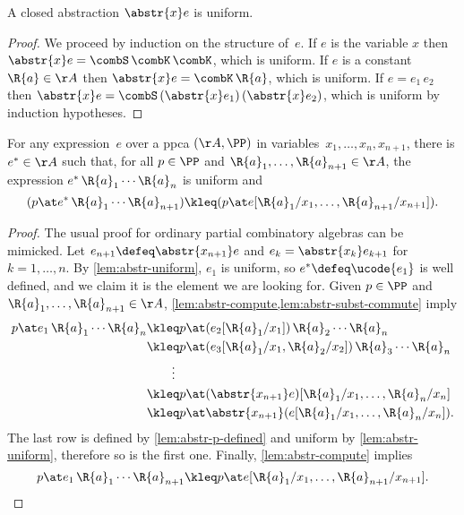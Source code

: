 \begin{lemma}
  \label{lem:abstr-uniform}%
  A closed abstraction $\abstr{x} e$ is uniform.
\end{lemma}

\begin{proof}
  We proceed by induction on the structure of~$e$.
  If $e$ is the variable $x$ then $\abstr{x} e = \combS \, \combK \, \combK$, which is uniform.
  If $e$ is a constant $\R{a} \in \AA$ then $\abstr{x} e = \combK \, \R{a}$, which is uniform.
  If $e = e_1 \, e_2$ then $\abstr{x} e = \combS \, (\abstr{x} e_1) \, (\abstr{x} e_2)$, which is uniform by induction hypotheses.
\end{proof}


\begin{theorem}
  For any expression~$e$ over a ppca $(\AA, \PP)$ in variables~$x_1, \ldots, x_n, x_{n+1}$, there is $e^{*} \in \AA$ such that, for all $p \in \PP$ and $\R{a}_1, \ldots, \R{a}_{n+1} \in \AA$, the expression $e^{*} \, \R{a}_1 \cdots \R{a}_n$ is uniform and
  \begin{equation*}
    (p \at e^{*} \, \R{a}_1 \cdots \R{a}_{n+1})
    \kleq
    (p \at e[\R{a}_1/x_1, \ldots, \R{a}_{n+1}/x_{n+1}]).
  \end{equation*}
\end{theorem}

\begin{proof}
  The usual proof for ordinary partial combinatory algebras can be mimicked.
  Let $e_{n+1} \defeq \abstr{x_{n+1}} e$ and $e_k = \abstr{x_k} e_{k+1}$ for $k = 1, \ldots, n$.
  By \cref{lem:abstr-uniform}, $e_1$ is uniform, so $e^{*} \defeq \ucode{e_1}$ is well defined,
  and we claim it is the element we are looking for.
  Given $p \in \PP$ and $\R{a}_1, \ldots, \R{a}_{n+1} \in \AA$, \cref{lem:abstr-compute,lem:abstr-subst-commute} imply
  \begin{align*}
    p \at e_1 \, \R{a}_1 \cdots \R{a}_n
    &\kleq p \at (e_2[\R{a}_1/x_1]) \, \R{a}_2 \cdots \R{a}_n \\
    &\kleq p \at (e_3[\R{a}_1/x_1, \R{a}_2/x_2]) \, \R{a}_3 \cdots \R{a}_n \\
    &\qquad \vdots \\
    &\kleq p \at (\abstr{x_{n+1}} e)[\R{a}_1/x_1, \ldots, \R{a}_n/x_n] \\
    &\kleq p \at \abstr{x_{n+1}} (e [\R{a}_1/x_1, \ldots, \R{a}_n/x_n]).
  \end{align*}
  The last row is defined by \cref{lem:abstr-p-defined} and uniform by \cref{lem:abstr-uniform},
  therefore so is the first one.
  Finally, \cref{lem:abstr-compute} implies
  \begin{equation*}
    p \at e_1 \, \R{a}_1 \cdots \R{a}_{n+1}
    \kleq 
    p \at e[\R{a}_1/x_1, \ldots, \R{a}_{n+1}/x_{n+1}]. \qedhere
  \end{equation*}
\end{proof}

